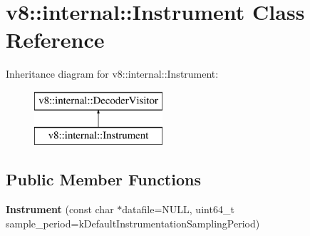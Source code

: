 \hypertarget{classv8_1_1internal_1_1_instrument}{}\section{v8\+:\+:internal\+:\+:Instrument Class Reference}
\label{classv8_1_1internal_1_1_instrument}
Inheritance diagram for v8\+:\+:internal\+:\+:Instrument\+:\begin{figure}[H]
\begin{center}
\leavevmode
\includegraphics[height=2.000000cm]{classv8_1_1internal_1_1_instrument}
\end{center}
\end{figure}
\subsection*{Public Member Functions}
\begin{DoxyCompactItemize}
\item 
{\bfseries Instrument} (const char $\ast$datafile=N\+U\+LL, uint64\+\_\+t sample\+\_\+period=k\+Default\+Instrumentation\+Sampling\+Period)\hypertarget{classv8_1_1internal_1_1_instrument_ad1ca591d1222710f6db79dbbbaadeda5}{}\label{classv8_1_1internal_1_1_instrument_ad1ca591d1222710f6db79dbbbaadeda5}

\end{DoxyCompactItemize}
